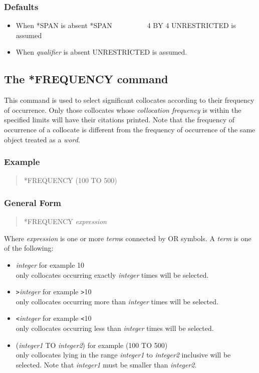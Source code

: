 \subsubsection{Defaults}
\begin{itemize}
\item When *SPAN is absent *SPAN~~~~~~~~~~4 BY 4 UNRESTRICTED is assumed
\item When {\em qualifier} is absent UNRESTRICTED is assumed.
\end{itemize}

\subsection{The *FREQUENCY command}
This command is used to select significant collocates according
to their frequency of occurrence.  Only those collocates whose {\em collocation
frequency} is within the specified limits will have their citations
printed.  Note that the frequency of occurrence of a collocate is
different from the frequency of occurrence of the same object treated
as a {\em word}.

\subsubsection{Example}
\begin{quote}
*FREQUENCY       (100 TO 500)
\end{quote}

\subsubsection{General Form}
\begin{quote}
*FREQUENCY       {\em expression}
\end{quote}

Where {\em expression} is one or more {\em term}s connected by OR symbols.  A
{\em term} is one of the following:
\begin{itemize}
\item  {\em integer}                 for example 10\\
    only collocates occurring exactly {\em integer} times will be selected.
\item \verb/>/{\em integer}                 for example \verb/>/10\\
    only collocates occurring more than {\em integer} times will be selected.
\item \verb/</{\em integer}                 for example \verb/</10\\
    only collocates occurring less than {\em integer} times will be selected.
\item ({\em integer1} TO {\em integer2})  for example (100 TO 500)\\
    only collocates lying in the range {\em integer1} to {\em integer2} inclusive
    will be selected. Note that {\em integer1} must be smaller than
    {\em integer2}.
\end{itemize}

